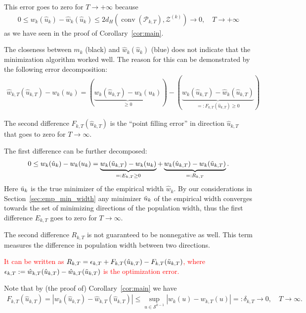 This error goes to zero for $T\to+\infty$ because
\begin{align*}
    0\le w_k(\hat{u}_k)-\hat{w}_k(\hat{u}_k)\le2d_H(\operatorname{conv}(\mathcal{P}_{k,T}),\mathcal{Z}^{(k)})\to0,\quad T\to+\infty
\end{align*}
as we have seen in the proof of Corollary~\ref{cor:main}.

The closeness between $m_k$ (black) and $\hat{w}_k(\hat{u}_k)$ (blue) does not indicate that the minimization algorithm worked well. The reason for this can be demonstrated by the following error decomposition:
\begin{align*}
    \hat{w}_{k,T}(\hat{u}_{k,T})-w_k(u_k)=\left(\underbrace{w_k(\hat{u}_{k,T})-w_k(u_k)}_{\ge0}\right)-\left(\underbrace{w_k(\hat{u}_{k,T})-\hat{w}_k(\hat{u}_{k,T})}_{=:F_{k,T}(\hat{u}_{k,T})\ge0}\right)
\end{align*}

The second difference $F_{k,T}(\hat{u}_{k,T})$ is the \enquote{point filling error} in direction $\hat{u}_{k,T}$ that goes to zero for $T\to\infty$.

The first difference can be further decomposed:
\begin{align*}
    0\le w_k(\hat{u}_k)-w_k(u_k)=\underbrace{w_k(\Tilde{u}_{k,T})-w_k(u_k)}_{=:E_{k,T}\ge0}+\underbrace{w_k(\hat{u}_{k,T})-w_k(\Tilde{u}_{k,T})}_{=:R_{k,T}}.
\end{align*}
Here $\Tilde{u}_k$ is the true minimizer of the empirical width $\hat{w}_k$. By our considerations in Section~\ref{sec:emp_min_width} any minimizer $\Tilde{u}_k$ of the empirical width converges towards the set of minimizing directions of the population width, thus the first difference $E_{k,T}$ goes to zero for $T\to\infty$.

The second difference $R_{k,T}$ is not guaranteed to be nonnegative as well. This term measures the difference in population width between two directions.

\textcolor{red}{It can be written as $R_{k,T}=\epsilon_{k,T}+F_{k,T}(\hat{u}_{k,T})-F_{k,T}(\Tilde{u}_{k,T})$, where $\epsilon_{k,T}:=\hat{w}_{k,T}(\hat{u}_{k,T})-\hat{w}_{k,T}(\Tilde{u}_{k,T})$ is the optimization error.}

Note that by (the proof of) Corollary~\ref{cor:main} we have
\begin{align*}
    F_{k,T}(\hat{u}_{k,T})=|w_k(\hat{u}_{k,T})-\hat{w}_{k,T}(\hat{u}_{k,T})|\le\sup_{u\in\mathcal{S}^{k-1}}|w_k(u)-w_{k,T}(u)|=:\delta_{k,T}\to0,\quad T\to\infty.
\end{align*}

